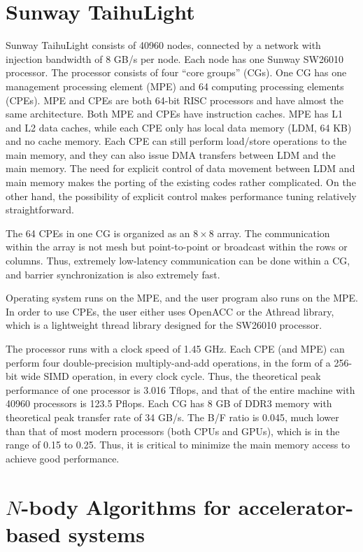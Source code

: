 \documentclass[oribibl]{llncs}
\begin{document}
\section{Sunway TaihuLight}
\label{sec:TaihuLight}

Sunway TaihuLight consists of 40960 nodes, connected by a network
with injection bandwidth of 8 GB/s per node. Each node has one Sunway
SW26010 processor.  The processor consists of four ``core groups''
(CGs). One CG has one management processing element (MPE) and 64
computing processing elements (CPEs).  MPE and CPEs are both 64-bit
RISC processors and have almost the same architecture. Both MPE and
CPEs have instruction caches. MPE has L1 and L2 data caches, while
each CPE only has local data memory (LDM, 64 KB) and no cache
memory. Each CPE can still perform load/store operations to the main
memory, and they can also issue DMA transfers between LDM and the main
memory. The need for explicit control of data movement between LDM and
main memory makes the porting of the existing codes rather
complicated. On the other hand, the possibility of explicit control
makes performance tuning relatively straightforward.

The 64 CPEs in one CG is organized as an $8\times 8$ array. The
communication within the array is not mesh but point-to-point or
broadcast within the rows or columns. Thus, extremely low-latency
communication can be done within a CG, and barrier synchronization is
also extremely fast.

Operating system runs on the MPE, and the user program also runs on
the MPE. In order to use CPEs, the user either uses OpenACC or the Athread
library, which is a lightweight thread library designed for the SW26010
processor.

The processor runs with a clock speed of 1.45 GHz. Each CPE (and MPE) can
perform four double-precision multiply-and-add operations, in the form
of a 256-bit wide SIMD operation, in every clock cycle. Thus, the
theoretical peak performance of one processor is 3.016 Tflops, and
that of the entire machine with 40960 processors is 123.5 Pflops.
Each CG has 8 GB of DDR3 memory with theoretical peak transfer rate of
34 GB/s. The B/F ratio is 0.045, much lower than that of most modern
processors (both CPUs and GPUs), which is in the range of 0.15 to
0.25. Thus, it is critical to minimize the main memory access to
achieve good performance.

\section{$N$-body Algorithms for accelerator-based systems}
\label{sec:impl0}
\end{document}
